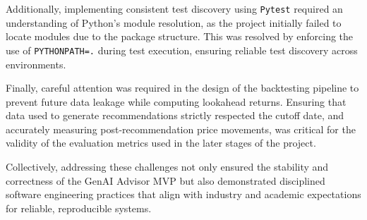 Additionally, implementing consistent test discovery using \texttt{Pytest} required an understanding of Python's module resolution, as the project initially failed to locate modules due to the package structure. This was resolved by enforcing the use of \texttt{PYTHONPATH=.} during test execution, ensuring reliable test discovery across environments.

Finally, careful attention was required in the design of the backtesting pipeline to prevent future data leakage while computing lookahead returns. Ensuring that data used to generate recommendations strictly respected the cutoff date, and accurately measuring post-recommendation price movements, was critical for the validity of the evaluation metrics used in the later stages of the project.

Collectively, addressing these challenges not only ensured the stability and correctness of the GenAI Advisor MVP but also demonstrated disciplined software engineering practices that align with industry and academic expectations for reliable, reproducible systems.
